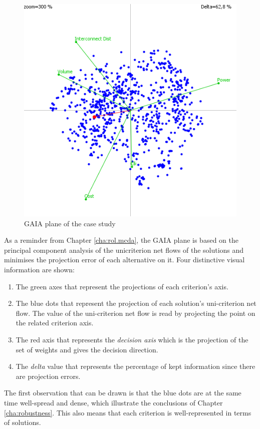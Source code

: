 \begin{figure}[h!]
\begin{center}
\includegraphics[width=0.8\linewidth]{gva804}
\end{center}
\caption{GAIA plane of the case study}
\label{fig:gva804}
\end{figure}

As a reminder from Chapter \ref{cha:rol.mcda}, the GAIA plane is based on the principal component analysis of the unicriterion net flows of the solutions and minimises the projection error of each alternative on it. Four distinctive visual information are shown:
\begin{enumerate}
\item The green axes that represent the projections of each criterion's axis.
\item The blue dots that represent the projection of each solution's uni-criterion net flow. The value of the uni-criterion net flow is read by projecting the point on the related criterion axis.
\item The red axis that represents the \textit{decision axis} which is the projection of the set of weights and gives the decision direction.
\item The \textit{delta} value that represents the percentage of kept information since there are projection errors.
\end{enumerate}

The first observation that can be drawn is that the blue dots are at the same time well-spread and dense, which illustrate the conclusions of Chapter \ref{cha:robustness}. This also means that each criterion is well-represented in terms of solutions.

